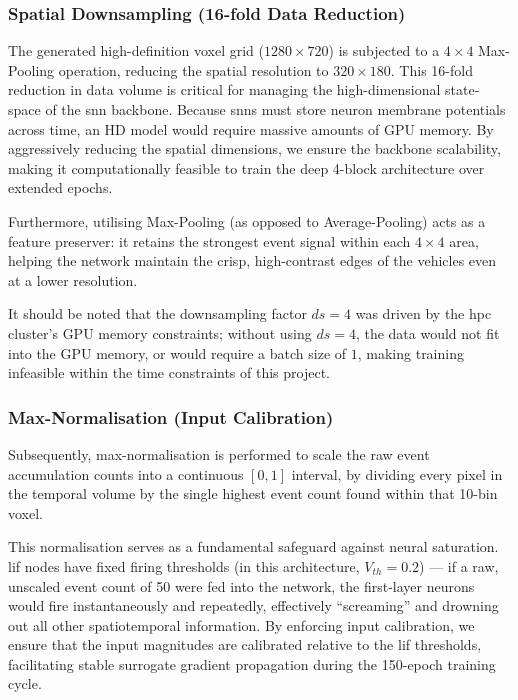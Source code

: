 \subsubsection{Spatial Downsampling (16-fold Data Reduction)}
The generated high-definition voxel grid ($1280 \times 720$) is subjected to a $4 \times 4$ Max-Pooling operation, reducing the spatial resolution to $320 \times 180$. 
This 16-fold reduction in data volume is critical for managing the high-dimensional state-space of the \gls{snn} backbone. 
Because \glspl{snn} must store neuron membrane potentials across time, an HD model would require massive amounts of GPU memory. 
By aggressively reducing the spatial dimensions, we ensure the backbone scalability, making it computationally feasible to train the deep 4-block architecture over extended epochs.

Furthermore, utilising Max-Pooling (as opposed to Average-Pooling) acts as a feature preserver: it retains the strongest event signal within each $4 \times 4$ area, helping the network maintain the crisp, high-contrast edges of the vehicles even at a lower resolution.

It should be noted that the downsampling factor $ds = 4$ was driven by the \gls{hpc} cluster's GPU memory constraints; without using $ds = 4$,
the data would not fit into the GPU memory, or would require a batch size of $1$, making training infeasible within the time constraints of this project.

\subsubsection{Max-Normalisation (Input Calibration)}

Subsequently, max-normalisation is performed to scale the raw event accumulation counts into a continuous $[0, 1]$ interval,
by dividing every pixel in the temporal volume by the single highest event count found within that 10-bin voxel.

This normalisation serves as a fundamental safeguard against neural saturation. 
\gls{lif} nodes have fixed firing thresholds (in this architecture, $V_{th}=0.2$) --- if a raw, unscaled event count of 50 were fed into the network, the first-layer neurons would fire instantaneously and repeatedly, effectively ``screaming'' and drowning out all other spatiotemporal information. 
By enforcing input calibration, we ensure that the input magnitudes are calibrated relative to the \gls{lif} thresholds, facilitating stable surrogate gradient propagation during the 150-epoch training cycle.

